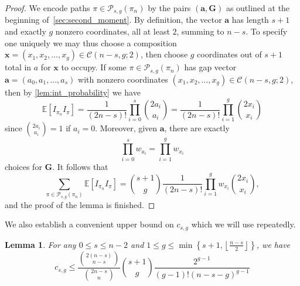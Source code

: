 \documentclass[11pt]{article}
\newtheorem{lemma}[theorem]{Lemma}
\theoremstyle{definition}
\theoremstyle{remark}
\theoremstyle{remark}
\numberwithin{theorem}{section}
\newcommand{\E}{\mathbb{E}}
\begin{document}
\begin{proof}
	We encode paths $\pi \in \mathcal{P}_{s,g}(\pi_{n})$ by the pairs $(\bm{a}, \bm{G})$ as outlined at the beginning of~\cref{sec:second_moment}. By definition, the vector $\bm{a}$ has length $s+1$ and exactly $g$ nonzero coordinates, all at least $2$, summing to $n-s$. To specify one uniquely we may thus choose a composition $\bm{x} = (x_{1}, x_{2},\dots,x_{g}) \in \mathcal{C}(n-s,g;2)$, then choose $g$ coordinates out of $s+1$ total in $a$ for $\bm{x}$ to occupy. If some $\pi \in \mathcal{P}_{s,g}(\pi_{n})$ has gap vector $\bm{a} = (a_{0},a_{1},\dots,a_{s})$ with nonzero coordinates $(x_{1},x_{2},\dots,x_{g}) \in \mathcal{C}(n-s,g;2)$, then by \cref{lem:int_probability} we have
	$$
		\E[I_{\pi_{n}}I_{\pi}] = \frac{1}{(2n-s)!}\prod_{i=0}^{s}\binom{2a_{i}}{a_{i}} = \frac{1}{(2n-s)!}\prod_{i=1}^{g}\binom{2x_{i}}{x_{i}}
	$$
	since $\binom{2a_{i}}{a_{i}} = 1$ if $a_{i} = 0$. Moreover, given $\bm{a}$, there are exactly 
	$$
		\prod_{i=0}^{s}w_{a_{i}} = \prod_{i=1}^{g}w_{x_{i}}
	$$
	choices for $\bm{G}$. It follows that
	$$
		\sum_{\pi \in \mathcal{P}_{s,g}(\pi_{n})}\E[I_{\pi_{n}}I_{\pi}] = \binom{s+1}{g}\frac{1}{(2n-s)!}\prod_{i=1}^{g}w_{x_{i}}\binom{2x_{i}}{x_{i}},
	$$
	and the proof of the lemma is finished.
\end{proof}


We also establish a convenient upper bound on $c_{s,g}$ which we will use repeatedly.

\begin{lemma}\label{lem:djk}
	For any $0 \leq s \leq n-2$ and $1 \leq g \leq \min\left\{s+1, \left\lfloor \frac{n-s}{2} \right\rfloor \right\}$, we have
	$$
		c_{s,g} \leq \frac{\binom{2(n-s)}{n-s}}{\binom{2n-s}{n}}\binom{s+1}{g}\frac{2^{g-1}}{(g-1)!(n-s-g)^{g-1}}
	$$
\end{lemma}
\end{document}
